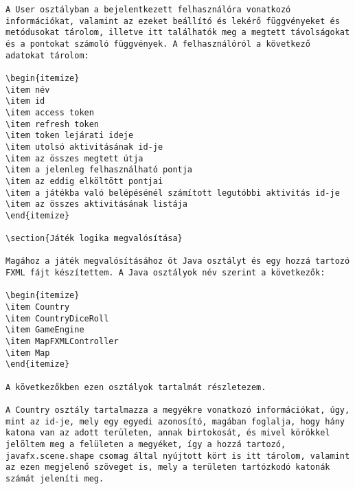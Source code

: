 \begin{verbatim}
A User osztályban a bejelentkezett felhasználóra vonatkozó információkat, valamint az ezeket beállító és lekérő függvényeket és metódusokat tárolom, illetve itt találhatók meg a megtett távolságokat és a pontokat számoló függvények. A felhasználóról a következő adatokat tárolom: 

\begin{itemize}
\item név 
\item id 
\item access token 
\item refresh token 
\item token lejárati ideje 
\item utolsó aktivitásának id-je 
\item az összes megtett útja 
\item a jelenleg felhasználható pontja 
\item az eddig elköltött pontjai 
\item a játékba való belépésénél számított legutóbbi aktivitás id-je 
\item az összes aktivitásának listája
\end{itemize}

\section{Játék logika megvalósítása}

Magához a játék megvalósításához öt Java osztályt és egy hozzá tartozó FXML fájt készítettem. A Java osztályok név szerint a következők: 

\begin{itemize}
\item Country 
\item CountryDiceRoll 
\item GameEngine 
\item MapFXMLController 
\item Map 
\end{itemize}

A következőkben ezen osztályok tartalmát részletezem. 

A Country osztály tartalmazza a megyékre vonatkozó információkat, úgy, mint az id-je, mely egy egyedi azonosító, magában foglalja, hogy hány katona van az adott területen, annak birtokosát, és mivel körökkel jelöltem meg a felületen a megyéket, így a hozzá tartozó, javafx.scene.shape csomag által nyújtott kört is itt tárolom, valamint az ezen megjelenő szöveget is, mely a területen tartózkodó katonák számát jeleníti meg. 


\end{verbatim}
